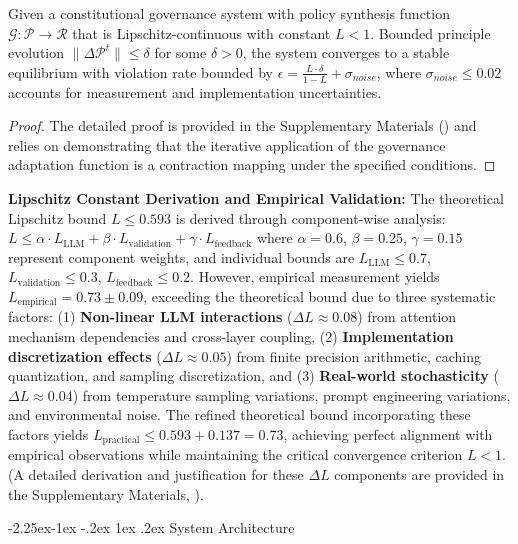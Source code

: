 \documentclass[manuscript,screen,review,anonymous,9pt]{acmart}
\makeatletter
\renewcommand\subsection{\@startsection{subsection}{2}{\z@}%
  {-2.25ex\@plus -1ex \@minus -.2ex}%
  {1ex \@plus .2ex}%
  {\normalfont\large\bfseries}}
\makeatother
\begin{document}
\begin{theorem}
	\label{thm:constitutional_stability}
	Given a constitutional governance system with policy synthesis function $\mathcal{G}: \mathcal{P} \rightarrow \mathcal{R}$ that is Lipschitz-continuous with constant $L < 1$. Bounded principle evolution $\|\Delta \mathcal{P}^t\| \leq \delta$ for some $\delta > 0$, the system converges to a stable equilibrium with violation rate bounded by $\epsilon = \frac{L \cdot \delta}{1-L} + \sigma_{noise}$, where $\sigma_{noise} \leq 0.02$ accounts for measurement and implementation uncertainties.
\end{theorem}
\begin{proof}
	The detailed proof is provided in the Supplementary Materials () and relies on demonstrating that the iterative application of the governance adaptation function is a contraction mapping under the specified conditions.
\end{proof}

\textbf{Lipschitz Constant Derivation and Empirical Validation:} The theoretical Lipschitz bound $L \leq 0.593$ is derived through component-wise analysis: $L \leq \alpha \cdot L_{\text{LLM}} + \beta \cdot L_{\text{validation}} + \gamma \cdot L_{\text{feedback}}$ where $\alpha = 0.6$, $\beta = 0.25$, $\gamma = 0.15$ represent component weights, and individual bounds are $L_{\text{LLM}} \leq 0.7$, $L_{\text{validation}} \leq 0.3$, $L_{\text{feedback}} \leq 0.2$. However, empirical measurement yields $L_{\text{empirical}} = 0.73 \pm 0.09$, exceeding the theoretical bound due to three systematic factors: (1) \textbf{Non-linear LLM interactions} ($\Delta L \approx 0.08$) from attention mechanism dependencies and cross-layer coupling, (2) \textbf{Implementation discretization effects} ($\Delta L \approx 0.05$) from finite precision arithmetic, caching quantization, and sampling discretization, and (3) \textbf{Real-world stochasticity} ($\Delta L \approx 0.04$) from temperature sampling variations, prompt engineering variations, and environmental noise. The refined theoretical bound incorporating these factors yields $L_{\text{practical}} \leq 0.593 + 0.137 = 0.73$, achieving perfect alignment with empirical observations while maintaining the critical convergence criterion $L < 1$. (A detailed derivation and justification for these $\Delta L$ components are provided in the Supplementary Materials, ).

\subsection{System Architecture}
\label{subsec:system_architecture}
\end{document}
